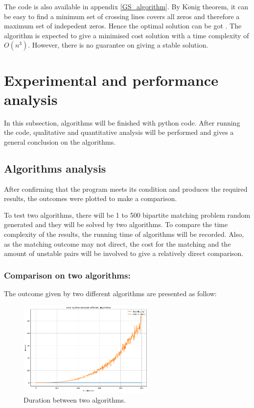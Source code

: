 \documentclass[14pt]{extarticle}
\begin{document}
The code is also available in appendix \ref{GS_algorithm}. 
By K$\ddot{o}$nig theorem, it can be easy to find a minimum set of crossing lines covers all zeros and therefore a maximum set of indepedent zeros.
Hence the optimal solution can be got \cite{Kuhn1955}.
The algorithm is expected to give a minimised cost solution with a time complexity of $O(n^3)$.
However, there is no guarantee on giving a stable solution. 

\section{Experimental and performance analysis} \label{performance_analysis}

In this subsection, algorithms will be finished with python code. 
After running the code, qualitative and quantitative analysis will be performed and gives a general conclusion on the algorithms.

\subsection{Algorithms analysis}

After confirming that the program meets its condition and produces the required results, the outcomes were plotted to make a comparison.

To test two algorithms, there will be 1 to 500 bipartite matching problem random generated and they will be solved by two algorithms.
To compare the time complexity of the results, the running time of algorithms will be recorded. 
Also, as the matching outcome may not direct, the cost for the matching and the amount of unstable pairs will be involved to give a relatively direct comparison. 

\subsubsection{Comparison on two algorithms:} 
The outcome given by two different algorithms are presented as follow: 

\begin{figure}[H]
  \centering
  \includegraphics[width=0.6\textwidth]{running_time_2_algorithms.png}
  \caption{Duration between two algorithms.}
\end{figure} 
\end{document}
